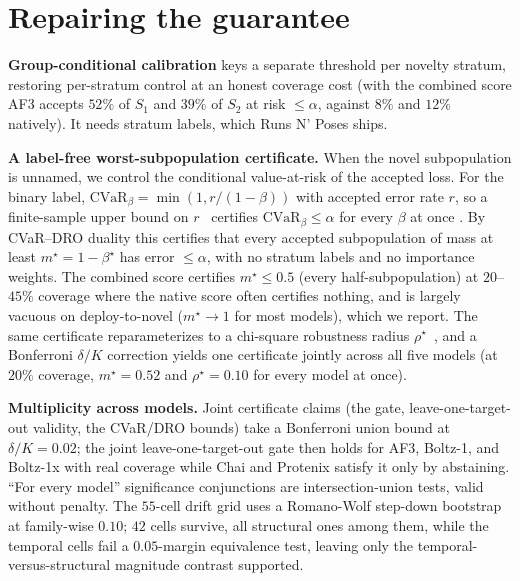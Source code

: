 \documentclass[10pt]{article}
\begin{document}
\section{Repairing the guarantee}\label{sec:repair}
\textbf{Group-conditional calibration} keys a separate threshold per novelty stratum, restoring
per-stratum control at an honest coverage cost (with the combined score AF3 accepts $52\%$ of $S_1$
and $39\%$ of $S_2$ at risk $\le\alpha$, against $8\%$ and $12\%$ natively). It needs stratum
labels, which Runs N' Poses ships.

\textbf{A label-free worst-subpopulation certificate.} When the novel subpopulation is unnamed,
we control the conditional value-at-risk of the accepted loss. For the binary label,
$\mathrm{CVaR}_\beta=\min(1,r/(1-\beta))$ with accepted error rate $r$, so a finite-sample upper
bound on $r$~\citep{bates2021rcps} certifies $\mathrm{CVaR}_\beta\le\alpha$ for every $\beta$ at once
\citep{snell2022qrc}. By CVaR--DRO duality this certifies that every accepted subpopulation of
mass at least $m^\star=1-\beta^\star$ has error $\le\alpha$, with no stratum labels and no
importance weights. The combined score certifies $m^\star\le 0.5$ (every half-subpopulation) at
$20$--$45\%$ coverage where the native score often certifies nothing, and is largely vacuous on
deploy-to-novel ($m^\star\!\to\!1$ for most models), which we report. The same certificate reparameterizes to a chi-square
robustness radius $\rho^\star$~\citep{cauchois2024}, and a Bonferroni $\delta/K$ correction yields
one certificate jointly across all five models (at $20\%$ coverage, $m^\star=0.52$ and
$\rho^\star=0.10$ for every model at once).

\textbf{Multiplicity across models.} Joint certificate claims (the gate, leave-one-target-out
validity, the CVaR/DRO bounds) take a Bonferroni union bound at $\delta/K=0.02$; the joint
leave-one-target-out gate then holds for AF3, Boltz-1, and Boltz-1x with real coverage while Chai and
Protenix satisfy it only by abstaining. ``For every model'' significance conjunctions are
intersection-union tests, valid without penalty. The $55$-cell drift grid uses a Romano-Wolf
step-down bootstrap~\citep{romanowolf2005} at family-wise $0.10$; $42$ cells survive, all structural
ones among them, while the temporal cells fail a $0.05$-margin equivalence test, leaving only the
temporal-versus-structural magnitude contrast supported.
\end{document}
